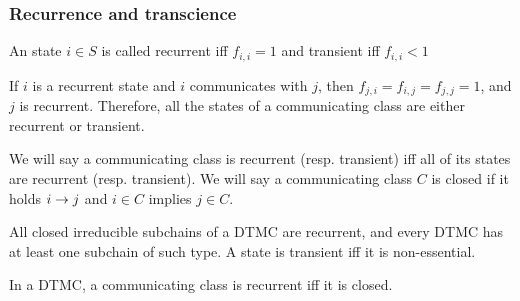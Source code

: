  \begin{frame} \frametitle{Recurrence and transcience}
    \vspace{2em}
    \begin{definition}
    An state \(i\in S\) is called recurrent iff \(f_{i,i} = 1\) and transient iff \(f_{i,i} < 1\)
    \end{definition}

    \begin{proposition}
    If \(i\) is a recurrent state and \(i\) communicates with \(j\), then 
    \(f_{j,i} = f_{i,j} = f_{j,j} = 1\), and \(j\) is recurrent. Therefore, all the states of a
    communicating class are either recurrent or transient.
    \end{proposition}
    
    \begin{definition}
    We will say a communicating class is recurrent (resp. transient) iff all of its states
    are recurrent (resp. transient). We will say a communicating class \(C\) is closed if it
    holds \(i \rightarrow j\) and \(i\in C\) implies \(j\in C\).
    \end{definition}
    
    \begin{proposition}
    All closed irreducible subchains of a DTMC are recurrent, and every DTMC has
    at least one subchain of such type. A state is transient iff it is non-essential.
    \end{proposition}
  
    \begin{corollary}
    In a DTMC, a communicating class is recurrent iff it is closed.
    \end{corollary}
    
 \end{frame}
 
